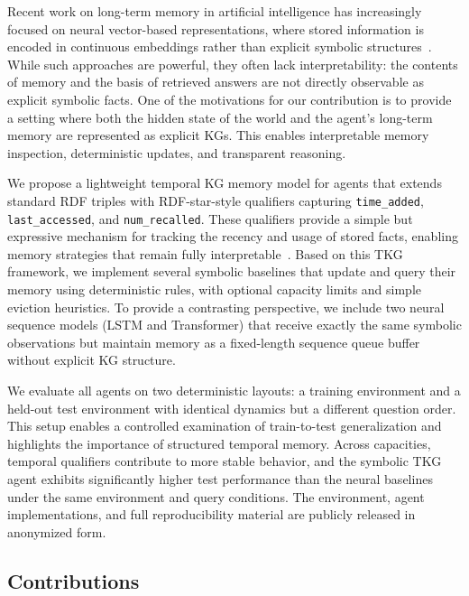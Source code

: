 \documentclass[runningheads]{llncs}
\begin{document}
Recent work on long-term memory in artificial intelligence has
increasingly focused on neural vector-based representations, where
stored information is encoded in continuous embeddings rather than
explicit symbolic structures~\cite{graves2014neural,graves2016hybrid,Wayne2018MERLIN,DBLP:journals/corr/abs-1803-10122,pritzel2017neuralepisodiccontrol,blundell2016modelfreeepisodiccontrol}. While such
approaches are powerful, they often lack interpretability: the contents
of memory and the basis of retrieved answers are not directly observable
as explicit symbolic facts. One of the motivations for our contribution
is to provide a setting where both the hidden state of the world and the
agent’s long-term memory are represented as explicit KGs. This enables interpretable memory inspection, deterministic updates, and transparent reasoning.

We propose a lightweight temporal KG memory model for agents that
extends standard RDF triples with RDF-star-style qualifiers capturing
\texttt{time\_added}, \texttt{last\_accessed}, and
\texttt{num\_recalled}. These qualifiers provide a simple but expressive
mechanism for tracking the recency and usage of stored facts, enabling
memory strategies that remain fully interpretable~\cite{10.1145/2452376.2452478}. Based on this TKG
framework, we implement several symbolic baselines that update and query
their memory using deterministic rules, with optional capacity limits
and simple eviction heuristics. To provide a contrasting perspective, we
include two neural sequence models (LSTM and Transformer) that receive exactly the same symbolic observations but maintain memory as a fixed-length sequence
queue buffer without explicit KG structure.

We evaluate all agents on two deterministic layouts: a training
environment and a held-out test environment with identical dynamics but
a different question order. This setup enables a controlled examination
of train-to-test generalization and highlights the importance of
structured temporal memory. Across capacities, temporal qualifiers
contribute to more stable behavior, and the symbolic TKG agent exhibits
significantly higher test performance than the neural baselines under the same environment and query conditions. The environment, agent implementations,
and full reproducibility material are publicly released in anonymized
form.

\subsection*{Contributions}
\end{document}
